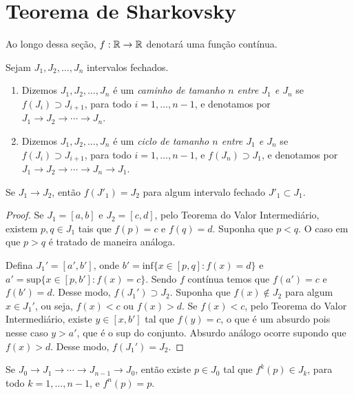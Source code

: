 \section{Teorema de Sharkovsky}
Ao longo dessa seção, $f: \mathbb{R} \to \mathbb{R}$ denotará uma função contínua.
\begin{definition}
Sejam $J_1, J_2, \dots, J_n$ intervalos fechados.
\begin{enumerate}
\item Dizemos $J_1, J_2, \dots, J_n$ é um \textit{caminho de tamanho $n$ entre $J_1$ e $J_n$} se $f(J_i) \supset J_{i+1}$, para todo $i = 1, \dots, n-1$, e denotamos por $J_1 \longrightarrow J_2 \longrightarrow \cdots \longrightarrow J_n$.

\item Dizemos $J_1, J_2, \dots, J_n$ é um \textit{ciclo de tamanho $n$ entre $J_1$ e $J_n$} se $f(J_i) \supset J_{i+1}$, para todo $i = 1, \dots, n-1$, e $f(J_n) \supset J_1$, e denotamos por $J_1 \longrightarrow J_2 \longrightarrow \cdots \longrightarrow J_n \longrightarrow J_1$.
\end{enumerate}
\end{definition}

\begin{proposition}
Se $J_1 \longrightarrow J_2$, então $f(J'_1) = J_2$ para algum intervalo fechado $J'_1 \subset J_1$.
\end{proposition}
\begin{proof}
Se $J_1 = [a, b]$ e $J_2 = [c, d]$, pelo Teorema do Valor Intermediário, existem $p, q \in J_1$ tais que $f(p) = c$ e $f(q) = d$. Suponha que $p < q$. O caso em que $p > q$ é tratado de maneira análoga.

Defina $J_1' = [a', b']$, onde $b' = \textrm{inf}\{x \in [p, q] : f(x) = d\}$ e $a' = \textrm{sup}\{x \in [p, b'] : f(x) = c\}$. Sendo $f$ contínua temos que $f(a') = c$ e $f(b') = d$. Desse modo, $f(J_1') \supset J_2$. Suponha que $f(x) \notin J_2$ para algum $x \in J_1'$, ou seja, $f(x) < c$ ou $f(x) > d$. Se $f(x) < c$, pelo Teorema do Valor Intermediário, existe $y \in [x, b']$ tal que $f(y) = c$, o que é um absurdo pois nesse caso $y > a'$, que é o sup do conjunto. Absurdo análogo ocorre supondo que $f(x) > d$. Desse modo, $f(J_1') = J_2$. 
\end{proof}

\begin{lemma}
Se $J_0 \longrightarrow J_1 \longrightarrow \cdots \longrightarrow J_{n-1} \longrightarrow J_0$, então existe $p \in J_0$ tal que $f^k(p) \in J_k$, para todo $k = 1, \dots, n-1$, e $f^n(p) = p$.
\end{lemma}

